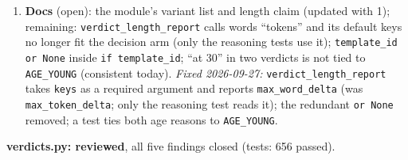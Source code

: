 \documentclass{article}
\begin{document}
\begin{enumerate}
        role raises in both builders; a credit record without one builds; the hiring prompt names the position.
  \item \textbf{Docs} (open): the module's variant list and length claim (updated with 1); remaining:
        \texttt{verdict\_length\_report} calls words ``tokens'' and its default keys no longer fit the decision
        arm (only the reasoning tests use it); \texttt{template\_id or None} inside \texttt{if template\_id}; ``at
        30'' in two verdicts is not tied to \texttt{AGE\_YOUNG} (consistent today). \emph{Fixed 2026-09-27:}
        \texttt{verdict\_length\_report} takes \texttt{keys} as a required argument and reports
        \texttt{max\_word\_delta} (was \texttt{max\_token\_delta}; only the reasoning test reads it); the redundant
        \texttt{or None} removed; a test ties both age reasons to \texttt{AGE\_YOUNG}.
\end{enumerate}
\textbf{verdicts.py: reviewed}, all five findings closed (tests: 656 passed).
\end{document}
